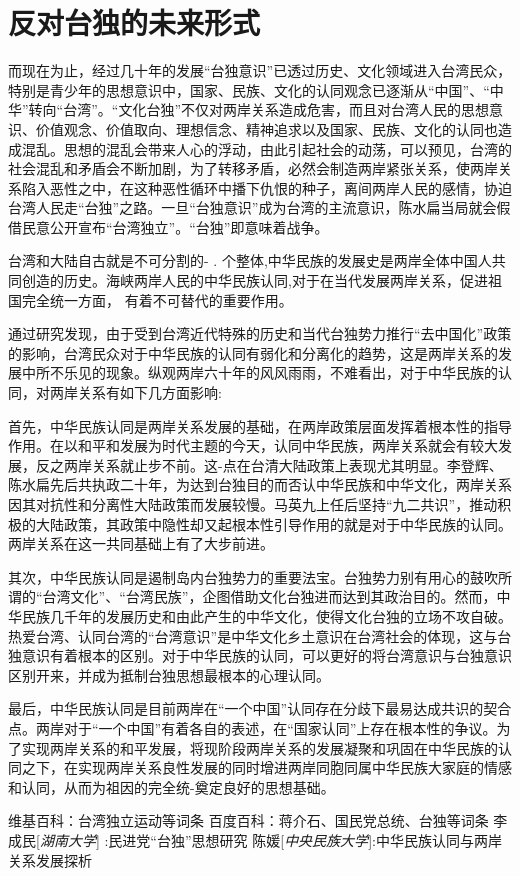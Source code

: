 \documentclass[11pt,a4paper]{ctexart}
\begin{document}
  \section{反对台独的未来形式}
  而现在为止，经过几十年的发展“台独意识”已透过历史、文化领域进入台湾民众，特别是青少年的思想意识中，国家、民族、文化的认同观念已逐渐从“中国”、“中华”转向“台湾”。“文化台独”不仅对两岸关系造成危害，而且对台湾人民的思想意识、价值观念、价值取向、理想信念、精神追求以及国家、民族、文化的认同也造成混乱。思想的混乱会带来人心的浮动，由此引起社会的动荡，可以预见，台湾的社会混乱和矛盾会不断加剧，为了转移矛盾，必然会制造两岸紧张关系，使两岸关系陷入恶性之中，在这种恶性循环中播下仇恨的种子，离间两岸人民的感情，协迫台湾人民走“台独”之路。一旦“台独意识”成为台湾的主流意识，陈水扁当局就会假借民意公开宣布“台湾独立”。“台独”即意味着战争。\par
  台湾和大陆自古就是不可分割的- . 个整体,中华民族的发展史是两岸全体中国人共同创造的历史。海峡两岸人民的中华民族认同,对于在当代发展两岸关系，促进祖国完全统一方面， 有着不可替代的重要作用。\par
  通过研究发现，由于受到台湾近代特殊的历史和当代台独势力推行“去中国化”政策的影响，台湾民众对于中华民族的认同有弱化和分离化的趋势，这是两岸关系的发展中所不乐见的现象。纵观两岸六十年的风风雨雨，不难看出，对于中华民族的认同，对两岸关系有如下几方面影响:\par
  首先，中华民族认同是两岸关系发展的基础，在两岸政策层面发挥着根本性的指导作用。在以和平和发展为时代主题的今天，认同中华民族，两岸关系就会有较大发展，反之两岸关系就止步不前。这-点在台清大陆政策上表现尤其明显。李登辉、陈水扁先后共执政二十年，为达到台独目的而否认中华民族和中华文化，两岸关系因其对抗性和分离性大陆政策而发展较慢。马英九上任后坚持“九二共识”，推动积极的大陆政策，其政策中隐性却又起根本性引导作用的就是对于中华民族的认同。两岸关系在这一共同基础上有了大步前进。\par
  其次，中华民族认同是遏制岛内台独势力的重要法宝。台独势力别有用心的鼓吹所谓的“台湾文化”、“台湾民族”，企图借助文化台独进而达到其政治目的。然而，中华民族几千年的发展历史和由此产生的中华文化，使得文化台独的立场不攻自破。热爱台湾、认同台湾的“台湾意识”是中华文化乡土意识在台湾社会的体现，这与台独意识有着根本的区别。对于中华民族的认同，可以更好的将台湾意识与台独意识区别开来，并成为抵制台独思想最根本的心理认同。\par
  最后，中华民族认同是目前两岸在“一个中国”认同存在分歧下最易达成共识的契合点。两岸对于“一个中国”有着各自的表述，在“国家认同”上存在根本性的争议。为了实现两岸关系的和平发展，将现阶段两岸关系的发展凝聚和巩固在中华民族的认同之下，在实现两岸关系良性发展的同时增进两岸同胞同属中华民族大家庭的情感和认同，从而为祖因的完全统-奠定良好的思想基础。\cite{q4}
  \begin{thebibliography}{99}
  	 维基百科：台湾独立运动等词条
  	 百度百科：蒋介石、国民党总统、台独等词条
  	 李成民[\emph{湖南大学}] :民进党``台独''思想研究
  	 陈媛[\emph{中央民族大学}]:中华民族认同与两岸关系发展探析
  	
  \end{thebibliography}
  
\end{document}
